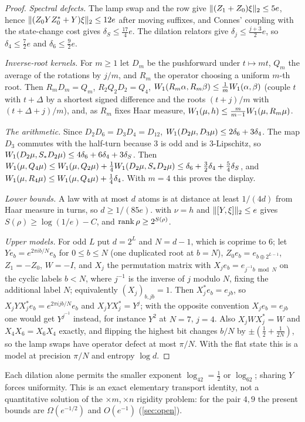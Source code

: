 \begin{proof}
\emph{Spectral defects.} The lamp swap and the row give $\lVert (Z_1+Z_0)\xi\rVert_2\le5e$, hence $\lVert (Z_0YZ_0^*+Y)\xi\rVert_2\le12e$ after moving
suffixes, and Connes' coupling with the state-change cost gives $\delta_S\le\frac{17}4e$. The dilation relators give
$\delta_j\le\frac{j+3}2e$, so $\delta_4\le\frac72e$ and $\delta_6\le\frac92e$.

\emph{Inverse-root kernels.} For $m\ge1$ let $D_m$ be the pushforward under $t\mapsto mt$, $Q_m$ the average of the rotations by
$j/m$, and $R_m$ the operator choosing a uniform $m$-th root. Then $R_mD_m=Q_m$, $R_2Q_2D_2=Q_4$,
$W_1(R_m\alpha,R_m\beta)\le\frac1mW_1(\alpha,\beta)$ (couple $t$ with $t+\Delta$ by a shortest signed difference and the roots
$(t+j)/m$ with $(t+\Delta+j)/m$), and, as $R_m$ fixes Haar measure, $W_1(\mu,h)\le\frac m{m-1}W_1(\mu,R_m\mu)$.

\emph{The arithmetic.} Since $D_2D_6=D_3D_4=D_{12}$, $W_1(D_2\mu,D_3\mu)\le2\delta_6+3\delta_4$. The map $D_3$ commutes with the
half-turn because $3$ is odd and is $3$-Lipschitz, so $W_1(D_2\mu,S_*D_2\mu)\le4\delta_6+6\delta_4+3\delta_S$. Then
$W_1(\mu,Q_4\mu)\le W_1(\mu,Q_2\mu)+\frac14W_1(D_2\mu,S_*D_2\mu)\le\delta_6+\frac32\delta_4+\frac54\delta_S$, and
$W_1(\mu,R_4\mu)\le W_1(\mu,Q_4\mu)+\frac14\delta_4$. With $m=4$ this proves the display.

\emph{Lower bounds.} A law with at most $d$ atoms is at distance at least $1/(4d)$ from Haar measure in turns, so $d\ge1/(85e)$.
 with $\nu=h$ and $\lVert [Y,\xi]\rVert_2\le e$ gives $S(\rho)\ge\log(1/e)-C$, and $\operatorname{rank}\rho\ge2^{S(\rho)}$.

\emph{Upper models.} For odd $L$ put $d=2^L$ and $N=d-1$, which is coprime to $6$; let $Y e_b=e^{2\pi ib/N}e_b$ for
$0\le b\le N$ (one duplicated root at $b=N$), $Z_0e_b=e_{b\oplus2^{L-1}}$, $Z_1=-Z_0$, $W=-I$, and $X_j$ the permutation matrix
with $X_je_b=e_{j^{-1}b\bmod N}$ on the cyclic labels $b<N$, where $j^{-1}$ is the inverse of $j$ modulo $N$, fixing the additional
label $N$; equivalently $(X_j)_{b,jb}=1$. Then $X_j^*e_b=e_{jb}$, so $X_jYX_j^*e_b=e^{2\pi ijb/N}e_b$ and $X_jYX_j^*=Y^j$; with the opposite
convention $X_je_b=e_{jb}$ one would get $Y^{j^{-1}}$ instead, for instance $Y^2$ at $N=7$, $j=4$. Also $X_jWX_j^*=W$ and $X_4X_6=X_6X_4$ exactly, and flipping the highest
bit changes $b/N$ by $\pm(\frac12+\frac1{2N})$, so the lamp swaps have operator defect at most $\pi/N$. With the flat state this is a
model at precision $\pi/N$ and entropy $\log d$.
\end{proof}

Each dilation alone permits the smaller exponent $\log_42=\frac12$ or $\log_62$; sharing $Y$ forces uniformity. This is an exact
elementary transport identity, not a quantitative solution of the $\times m,\times n$ rigidity problem: for the pair $4,9$ the
present bounds are $\Omega(e^{-1/2})$ and $O(e^{-1})$ (\cref{sec:open}).
